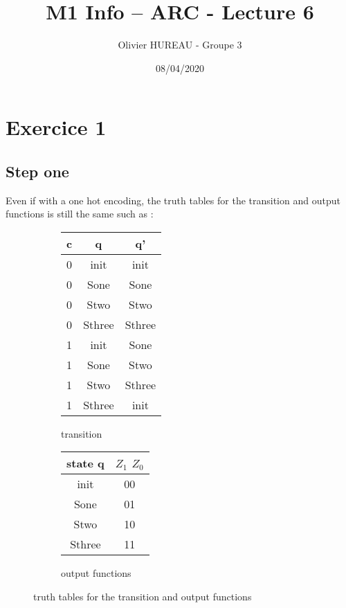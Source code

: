 \documentclass{article}
\title{M1 Info – ARC - Lecture 6}
\author{Olivier HUREAU - Groupe 3}
\date{08/04/2020}
\newcommand{\sautligne}{
\textbf{\vspace{5mm}}
}
\begin{document}
\maketitle


\section{Exercice 1}
\subsection{Step one}
Even if with a one hot encoding, the truth tables for the transition and output functions is still the same such as :
\sautligne

\begin{figure}[h!]
\begin{subfigure}{0.5\textwidth}
\centering
	\begin{tabular}{l | c | c}
	
	c & q & q' \\
\hline	
   0 & init & init \\
   0 & Sone & Sone \\
   0 & Stwo & Stwo  \\
   0 & Sthree & Sthree \\
   1 & init & Sone \\
   1 & Sone & Stwo \\
   1 & Stwo  & Sthree \\
   1 & Sthree & init \\
 \end{tabular}

 \caption{transition}
\end{subfigure}
\hfill 
\begin{subfigure}{0.5\textwidth}
\centering
  \begin{tabular}{ c | c}
	
	state q & $Z_1$ $Z_0$ \\
\hline	
    init & 00 \\
    Sone & 01 \\
   Stwo & 10  \\
    Sthree & 11 \\
   
 \end{tabular}
  \caption{output functions}
\end{subfigure}
 
 \caption{ truth tables for the transition and output functions}
 \end{figure}
 
\end{document}
